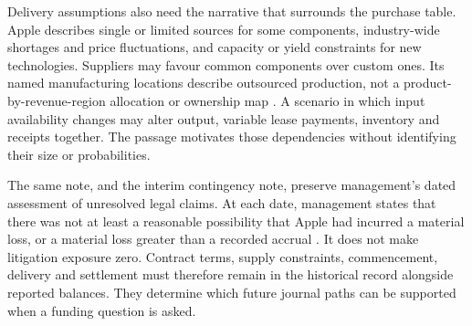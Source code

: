 Delivery assumptions also need the narrative that surrounds the purchase
table. Apple describes single or limited sources for some components,
industry-wide shortages and price fluctuations, and capacity or yield
constraints for new technologies. Suppliers may favour common components over
custom ones. Its named manufacturing locations describe outsourced production,
not a product-by-revenue-region allocation or ownership map
\citep[Note 12, printed p.~46]{apple2024}. A scenario in which input availability
changes may alter output, variable lease payments, inventory and receipts
together. The passage motivates those dependencies without identifying their
size or probabilities.

The same note, and the interim contingency note, preserve management's dated
assessment of unresolved legal claims. At each date, management states that
there was not at least a reasonable possibility that Apple had incurred a
material loss, or a material loss greater than a recorded accrual
\citep[Note 12, printed p.~46]{apple2024}
\citep[Note 9, printed p.~11]{apple2025q1}. It does not make litigation exposure
zero. Contract terms, supply constraints, commencement, delivery and settlement
must therefore remain in the historical record alongside reported balances.
They determine which future journal paths can be supported when a funding
question is asked.














